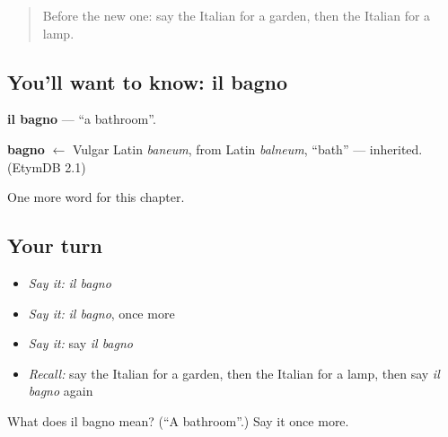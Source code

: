 \label{lesson:IT-C57-bagno}



\begin{quote}
Before the new one: say the Italian for a garden, then the Italian for a lamp.
\end{quote}

\subsection*{You'll want to know: il bagno}
\textbf{il bagno} — \textquotedblleft{}a bathroom\textquotedblright{}.

\begin{cousinweb}
\textbf{bagno} $\leftarrow$ Vulgar Latin \emph{baneum}, from Latin \emph{balneum}, \textquotedblleft{}bath\textquotedblright{} — inherited. (EtymDB 2.1)
\end{cousinweb}

\begin{grammarlens}[title={What you've built}]
One more word for this chapter.
\end{grammarlens}

\subsection*{Your turn}
\begin{itemize}
\raggedright
  \item \emph{Say it:} \emph{il bagno}
  \item \emph{Say it:} \emph{il bagno}, once more
  \item \emph{Say it:} say \emph{il bagno}
  \item \emph{Recall:} say the Italian for a garden, then the Italian for a lamp, then say \emph{il bagno} again
\end{itemize}

\begin{tcolorbox}[breakable,colback=teal!4,colframe=teal!35!black,title={Before you move on}]
What does il bagno mean? (\textquotedblleft{}A bathroom\textquotedblright{}.) Say it once more.
\end{tcolorbox}
